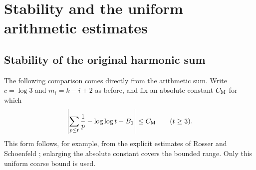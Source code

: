 \section{Stability and the uniform arithmetic estimates}\label{paper:assembly}
\subsection{Stability of the original harmonic sum}
\label{sec:ell-stability}

The following comparison comes directly from the arithmetic sum.
Write $c=\log3$ and $m_i=k-i+2$ as before, and fix an absolute constant
$C_{\rm M}$ for which
\[
 \left|\sum_{p\le t}\frac1p-\log\log t-B_1\right|
 \le C_{\rm M}\qquad(t\ge3).
\]
This form follows, for example, from the explicit estimates of
Rosser and Schoenfeld \cite{RosserSchoenfeld1962}; enlarging the absolute
constant covers the bounded range. Only this uniform coarse bound is used.

